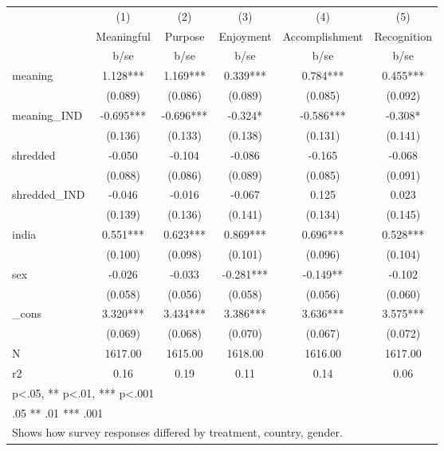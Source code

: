{
\def\sym#1{\ifmmode^{#1}\else\(^{#1}\)\fi}
\begin{tabular}{l*{5}{c}}
\hline\hline
            &\multicolumn{1}{c}{(1)}   &\multicolumn{1}{c}{(2)}   &\multicolumn{1}{c}{(3)}   &\multicolumn{1}{c}{(4)}   &\multicolumn{1}{c}{(5)}   \\
            &  Meaningful   &     Purpose   &   Enjoyment   &Accomplishment   & Recognition   \\
            &        b/se   &        b/se   &        b/se   &        b/se   &        b/se   \\
\hline
meaning     &       1.128***&       1.169***&       0.339***&       0.784***&       0.455***\\
            &     (0.089)   &     (0.086)   &     (0.089)   &     (0.085)   &     (0.092)   \\
[1em]
meaning\_IND &      -0.695***&      -0.696***&      -0.324*  &      -0.586***&      -0.308*  \\
            &     (0.136)   &     (0.133)   &     (0.138)   &     (0.131)   &     (0.141)   \\
[1em]
shredded    &      -0.050   &      -0.104   &      -0.086   &      -0.165   &      -0.068   \\
            &     (0.088)   &     (0.086)   &     (0.089)   &     (0.085)   &     (0.091)   \\
[1em]
shredded\_IND&      -0.046   &      -0.016   &      -0.067   &       0.125   &       0.023   \\
            &     (0.139)   &     (0.136)   &     (0.141)   &     (0.134)   &     (0.145)   \\
[1em]
india       &       0.551***&       0.623***&       0.869***&       0.696***&       0.528***\\
            &     (0.100)   &     (0.098)   &     (0.101)   &     (0.096)   &     (0.104)   \\
[1em]
sex         &      -0.026   &      -0.033   &      -0.281***&      -0.149** &      -0.102   \\
            &     (0.058)   &     (0.056)   &     (0.058)   &     (0.056)   &     (0.060)   \\
[1em]
\_cons      &       3.320***&       3.434***&       3.386***&       3.636***&       3.575***\\
            &     (0.069)   &     (0.068)   &     (0.070)   &     (0.067)   &     (0.072)   \\
\hline
N           &     1617.00   &     1615.00   &     1618.00   &     1616.00   &     1617.00   \\
r2          &        0.16   &        0.19   &        0.11   &        0.14   &        0.06   \\
\hline\hline
\multicolumn{6}{l}{\footnotesize * p<.05, ** p<.01, *** p<.001}\\
\multicolumn{6}{l}{\footnotesize * .05 ** .01 *** .001}\\
\multicolumn{6}{l}{\footnotesize Shows how survey responses differed by treatment, country, gender.}\\
\end{tabular}
}
